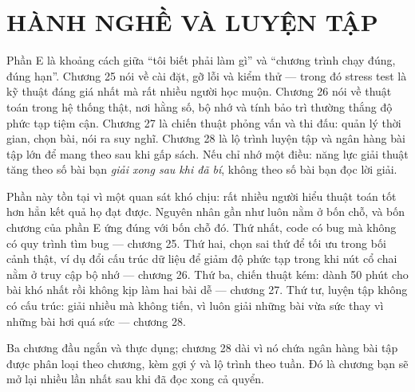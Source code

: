 \documentclass[../algorithm.tex]{subfiles}
\begin{document}
\part{HÀNH NGHỀ VÀ LUYỆN TẬP}
\begin{tomtat}
Phần E là khoảng cách giữa ``tôi biết phải làm gì'' và ``chương trình chạy đúng, đúng hạn''. Chương 25 nói về cài đặt, gỡ lỗi và kiểm thử --- trong đó stress test là kỹ thuật đáng giá nhất mà rất nhiều người học muộn. Chương 26 nói về thuật toán trong hệ thống thật, nơi hằng số, bộ nhớ và tính bảo trì thường thắng độ phức tạp tiệm cận. Chương 27 là chiến thuật phỏng vấn và thi đấu: quản lý thời gian, chọn bài, nói ra suy nghĩ. Chương 28 là lộ trình luyện tập và ngân hàng bài tập lớn để mang theo sau khi gấp sách. Nếu chỉ nhớ một điều: năng lực giải thuật tăng theo số bài bạn \emph{giải xong sau khi đã bí}, không theo số bài bạn đọc lời giải.
\end{tomtat}

Phần này tồn tại vì một quan sát khó chịu: rất nhiều người hiểu thuật toán tốt hơn hẳn kết quả họ đạt được. Nguyên nhân gần như luôn nằm ở bốn chỗ, và bốn chương của phần E ứng đúng với bốn chỗ đó. Thứ nhất, code có bug mà không có quy trình tìm bug --- chương 25. Thứ hai, chọn sai thứ để tối ưu trong bối cảnh thật, ví dụ đổi cấu trúc dữ liệu để giảm độ phức tạp trong khi nút cổ chai nằm ở truy cập bộ nhớ --- chương 26. Thứ ba, chiến thuật kém: dành 50 phút cho bài khó nhất rồi không kịp làm hai bài dễ --- chương 27. Thứ tư, luyện tập không có cấu trúc: giải nhiều mà không tiến, vì luôn giải những bài vừa sức thay vì những bài hơi quá sức --- chương 28.

Ba chương đầu ngắn và thực dụng; chương 28 dài vì nó chứa ngân hàng bài tập được phân loại theo chương, kèm gợi ý và lộ trình theo tuần. Đó là chương bạn sẽ mở lại nhiều lần nhất sau khi đã đọc xong cả quyển.





\ifSubfilesClassLoaded{\printbibliography[title={Nguồn}]}{}
\end{document}
